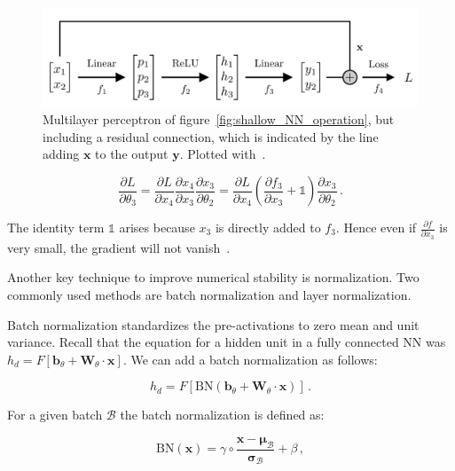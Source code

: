 \begin{figure}[t]
    \centering
    \includegraphics[width=0.95\linewidth]{figures/04_transformer/ResidualMLP.png}
    \caption{Multilayer perceptron of figure~\ref{fig:shallow_NN_operation}, but including a residual connection, which is indicated by the line adding $\mathbf{x}$ to the output $\mathbf{y}$. Plotted with~\cite{the_manim_community_developers_manim_2025}.}
\label{fig:ResidualMLP}
\end{figure}


\begin{equation}
\label{eq:backprop_resnet}
	\frac{\partial L}{\partial \theta_3} = \frac{\partial L}{\partial x_4} \frac{\partial x_4}{\partial x_3} \frac{\partial x_3}{\partial \theta_2} = \frac{\partial L}{\partial x_4} \left( \frac{\partial f_3}{\partial x_3} + \mathbb{1} \right) \frac{\partial x_3}{\partial \theta_2} \,.
\end{equation}

The identity term $\mathbb{1}$ arises because $x_3$ is directly added to $f_3$. Hence even if $\frac{\partial f}{\partial x_3}$ is very small, the gradient will not vanish~\cite{murphy_probabilistic_2022}.

Another key technique to improve numerical stability is normalization. Two commonly used methods are batch normalization and layer normalization. 

Batch normalization standardizes the pre-activations to zero mean and unit variance. Recall that the equation for a hidden unit in a fully connected NN was $h_d = F \left[ \mathbf{b}_\theta + \mathbf{W}_{\theta} \cdot \mathbf{x} \right]$. 
We can add a batch normalization as follows: 

\begin{equation}
\label{eq:NN_hidden_unit_BN}
	h_d = F \left[ \mathrm{BN}(\mathbf{b}_\theta + \mathbf{W}_{\theta} \cdot \mathbf{x}) \right] \,.
\end{equation}

For a given batch $\mathcal{B}$ the batch normalization is defined as:

\begin{equation}
\label{eq:BN_def}
	\mathrm{BN}(\mathbf{x}) = \gamma \circ \frac{\mathbf{x} - \mathbf{\mu_{\mathcal{B}}}}{\mathbf{\sigma_{\mathcal{B}}}} + \beta \,,
\end{equation}

